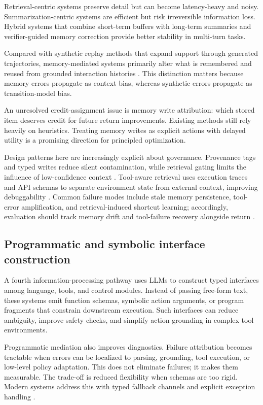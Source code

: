 ﻿\documentclass[conference]{IEEEtran}
\begin{document}
Retrieval-centric systems preserve detail but can become latency-heavy and noisy. Summarization-centric systems are efficient but risk irreversible information loss. Hybrid systems that combine short-term buffers with long-term summaries and verifier-guided memory correction provide better stability in multi-turn tasks.

Compared with synthetic replay methods that expand support through generated trajectories, memory-mediated systems primarily alter what is remembered and reused from grounded interaction histories \cite{arxiv_p_2601_08107,arxiv_p_2602_02137,arxiv_p_2602_03305}. This distinction matters because memory errors propagate as context bias, whereas synthetic errors propagate as transition-model bias.

An unresolved credit-assignment issue is memory write attribution: which stored item deserves credit for future return improvements. Existing methods still rely heavily on heuristics. Treating memory writes as explicit actions with delayed utility is a promising direction for principled optimization.

Design patterns here are increasingly explicit about governance. Provenance tags and typed writes reduce silent contamination, while retrieval gating limits the influence of low-confidence context \cite{arxiv_p_2602_00994,arxiv_p_2601_07264,arxiv_p_2602_00528}. Tool-aware retrieval uses execution traces and API schemas to separate environment state from external context, improving debuggability \cite{arxiv_p_2601_02439,arxiv_p_2509_06501,arxiv_p_2509_12867}. Common failure modes include stale memory persistence, tool-error amplification, and retrieval-induced shortcut learning; accordingly, evaluation should track memory drift and tool-failure recovery alongside return \cite{arxiv_p_2404_03648,arxiv_p_2601_03555,arxiv_p_2511_14460}.

\subsection{Programmatic and symbolic interface construction}
A fourth information-processing pathway uses LLMs to construct typed interfaces among language, tools, and control modules. Instead of passing free-form text, these systems emit function schemas, symbolic action arguments, or program fragments that constrain downstream execution. Such interfaces can reduce ambiguity, improve safety checks, and simplify action grounding in complex tool environments.

Programmatic mediation also improves diagnostics. Failure attribution becomes tractable when errors can be localized to parsing, grounding, tool execution, or low-level policy adaptation. This does not eliminate failures; it makes them measurable. The trade-off is reduced flexibility when schemas are too rigid. Modern systems address this with typed fallback channels and explicit exception handling \cite{doi_p_10_3390_make8010022,arxiv_p_2512_20275,arxiv_p_2602_03022,doi_p_10_1609_icaps_v34i1_31503}.
\end{document}
